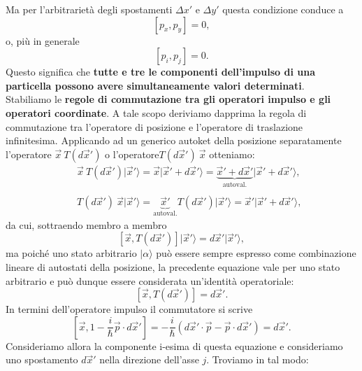 \documentclass[a4paper,12pt,oneside]{book}
\begin{document}
Ma per l'arbitrarietà degli spostamenti $\Delta x'$ e  $\Delta y'$ questa condizione conduce a
\begin{equation}
\left[p_x , p_y\right] =0,
\end{equation}
o, più in generale
\begin{equation}
\left[p_i , p_j\right] =0.
\end{equation}
Questo significa che \textbf{tutte e tre le componenti dell'impulso di una particella possono avere simultaneamente valori determinati}.\\
Stabiliamo le \textbf{regole di commutazione tra gli operatori impulso e gli operatori coordinate}. A tale scopo deriviamo dapprima la regola di commutazione tra l'operatore di posizione e l'operatore di traslazione infinitesima. Applicando ad un generico autoket della posizione separatamente l'operatore $\vec{x}\ T(d\vec{x}')$ o l'operatore$T(d\vec{x}')\ \vec{x}$ otteniamo:
\begin{eqnarray}
& & \vec{x}\ T(d\vec{x}')\vert \vec{x}' \rangle = \vec{x}\vert\vec{x}'+d\vec{x}'\rangle =\underbrace{\vec{x}'+d\vec{x}'}_{\textrm{autoval.}}\vert\vec{x}'+d\vec{x}'\rangle ,  \\
 \nonumber \\
& & T(d\vec{x}')\ \vec{x} \vert \vec{x}' \rangle = \underbrace{\vec{x}'}_{\textrm{autoval.}} T(d\vec{x}')\vert \vec{x}'\rangle = \vec{x}'\vert \vec{x}'+d\vec{x}'\rangle ,
\end{eqnarray}
da cui, sottraendo membro a membro
\begin{equation}
\left[\vec{x}, T(d\vec{x}')\right]\vert \vec{x}' \rangle = d\vec{x}' \vert \vec{x}' \rangle ,
\end{equation}
ma poiché uno stato arbitrario $\vert \alpha \rangle $ può essere sempre espresso come combinazione lineare di autostati della posizione, la precedente equazione vale per uno stato arbitrario e può dunque essere considerata un'identità operatoriale:
\begin{equation}
\left[\vec{x}, T(d\vec{x}')\right] = d\vec{x}'  .
\end{equation}
In termini dell'operatore impulso il commutatore si scrive
\begin{equation}
\left[ \vec{x}, 1- \frac{i}{\hbar}\vec{p}\cdot d\vec{x}'\right] =-\frac{i}{\hbar}\left(d\vec{x}'\cdot \vec{p}-\vec{p}\cdot d\vec{x}' \right) =d\vec{x}' .
\end{equation}
Consideriamo allora la componente i-esima di questa equazione e consideriamo uno spostamento $d\vec{x}'$ nella direzione dell'asse $j$. Troviamo in tal modo:
\end{document}
